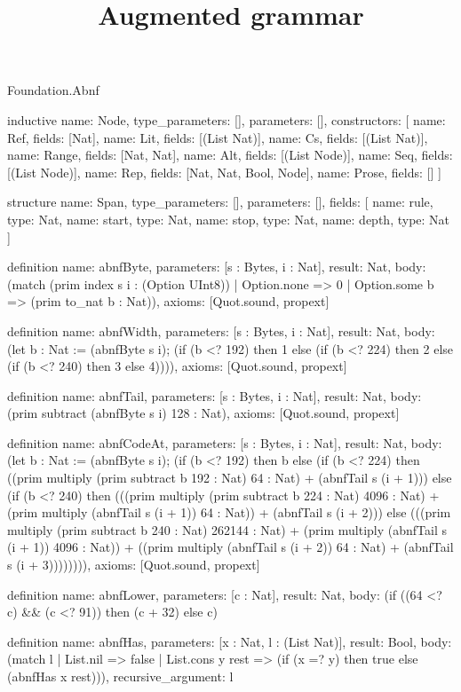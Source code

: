\begin{lexlean}{Foundation.Abnf}
\title{Augmented grammar}
\begin{semanticmodule}
inductive{
  name: Node,
  type_parameters: [],
  parameters: [],
  constructors: [
    {name: Ref, fields: [Nat]},
    {name: Lit, fields: [(List Nat)]},
    {name: Cs, fields: [(List Nat)]},
    {name: Range, fields: [Nat, Nat]},
    {name: Alt, fields: [(List Node)]},
    {name: Seq, fields: [(List Node)]},
    {name: Rep, fields: [Nat, Nat, Bool, Node]},
    {name: Prose, fields: []}
  ]
}

structure{
  name: Span,
  type_parameters: [],
  parameters: [],
  fields: [
    {name: rule, type: Nat},
    {name: start, type: Nat},
    {name: stop, type: Nat},
    {name: depth, type: Nat}
  ]
}

definition{
  name: abnfByte,
  parameters: [s : Bytes, i : Nat],
  result: Nat,
  body: (match (prim index s i : (Option UInt8))
    | Option.none => 0
    | Option.some b => (prim to_nat b : Nat)),
  axioms: [Quot.sound, propext]
}

definition{
  name: abnfWidth,
  parameters: [s : Bytes, i : Nat],
  result: Nat,
  body: (let b : Nat := (abnfByte s i); (if (b <? 192) then 1 else (if (b <? 224) then 2 else (if (b <? 240) then 3 else 4)))),
  axioms: [Quot.sound, propext]
}

definition{
  name: abnfTail,
  parameters: [s : Bytes, i : Nat],
  result: Nat,
  body: (prim subtract (abnfByte s i) 128 : Nat),
  axioms: [Quot.sound, propext]
}

definition{
  name: abnfCodeAt,
  parameters: [s : Bytes, i : Nat],
  result: Nat,
  body: (let b : Nat := (abnfByte s i); (if (b <? 192) then b else (if (b <? 224) then ((prim multiply (prim subtract b 192 : Nat) 64 : Nat) + (abnfTail s (i + 1))) else (if (b <? 240) then (((prim multiply (prim subtract b 224 : Nat) 4096 : Nat) + (prim multiply (abnfTail s (i + 1)) 64 : Nat)) + (abnfTail s (i + 2))) else (((prim multiply (prim subtract b 240 : Nat) 262144 : Nat) + (prim multiply (abnfTail s (i + 1)) 4096 : Nat)) + ((prim multiply (abnfTail s (i + 2)) 64 : Nat) + (abnfTail s (i + 3)))))))),
  axioms: [Quot.sound, propext]
}

definition{
  name: abnfLower,
  parameters: [c : Nat],
  result: Nat,
  body: (if ((64 <? c) && (c <? 91)) then (c + 32) else c)
}

definition{
  name: abnfHas,
  parameters: [x : Nat, l : (List Nat)],
  result: Bool,
  body: (match l
    | List.nil => false
    | List.cons y rest => (if (x =? y) then true else (abnfHas x rest))),
  recursive_argument: l
}


\end{semanticmodule}
\end{lexlean}
